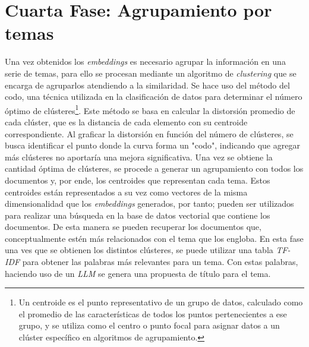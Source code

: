     \section{Cuarta Fase: Agrupamiento por temas}
    Una vez obtenidos los \emph{embeddings} es necesario agrupar la información en una serie de temas, para ello se procesan mediante un algoritmo de \emph{clustering} que se encarga de agruparlos atendiendo a la similaridad. Se hace uso del método del codo, una técnica utilizada en la clasificación de datos para determinar el número óptimo de clústeres\footnote{Un centroide es el punto representativo de un grupo de datos, calculado como el promedio de las características de todos los puntos pertenecientes a ese grupo, y se utiliza como el centro o punto focal para asignar datos a un clúster específico en algoritmos de agrupamiento.}. Este método se basa en calcular la distorsión promedio de cada clúster, que es la distancia de cada elemento con su centroide correspondiente. Al graficar la distorsión en función del número de clústeres, se busca identificar el punto donde la curva forma un "codo", indicando que agregar más clústeres no aportaría una mejora significativa. Una vez se obtiene la cantidad óptima de clústeres, se procede a generar un agrupamiento con todos los documentos y, por ende, los centroides que representan cada tema. Estos centroides están representados a su vez como vectores de la misma dimensionalidad que los \emph{embeddings} generados, por tanto; pueden ser utilizados para realizar una búsqueda en la base de datos vectorial que contiene los documentos. De esta manera se pueden recuperar los documentos que, conceptualmente estén más relacionados con el tema que los engloba. En esta fase una ves que se obtienen los distintos clústeres, se puede utilizar una tabla \emph{TF-IDF} para obtener las palabras más relevantes para un tema. Con estas palabras, haciendo uso de un \emph{LLM} se genera una propuesta de título para el tema.

